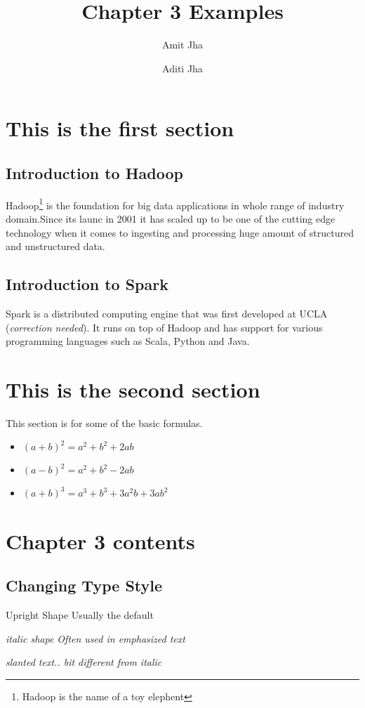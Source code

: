 \documentclass[twocolumn]{article}
\title {Chapter 3 Examples}
\author {Amit Jha \and Aditi Jha}
\begin{document}
\maketitle

\section {This is the first section}
\subsection {Introduction to Hadoop}
Hadoop\footnote{Hadoop is the name of a toy elephent} is the foundation for big data applications in whole range of industry domain.Since its launc in 2001 it has scaled up to be one of the cutting edge technology when it comes to ingesting and processing huge amount of structured and unstructured data.
\subsection {Introduction to Spark}
Spark is a distributed computing engine that was first developed at UCLA (\emph{correction needed}). It runs on top of Hadoop and has support for various programming languages such as Scala, Python and Java.
\section {This is the second section}
This section is for some of the basic formulas.
\begin{itemize}
\item $(a+b)^2 = a^2 + b^2 + 2ab$
\item $(a-b)^2 = a^2 + b^2 - 2ab$
\item $(a+b)^3 = a^3 + b^3 + 3a^2b + 3ab^2 $
\end{itemize}
\section {Chapter 3 contents}
\subsection {Changing Type Style}

\textup{Upright Shape Usually the default}

\textit{italic shape Often used in emphasized text}

\textsl{slanted text.. bit different from italic}
\end{document}
